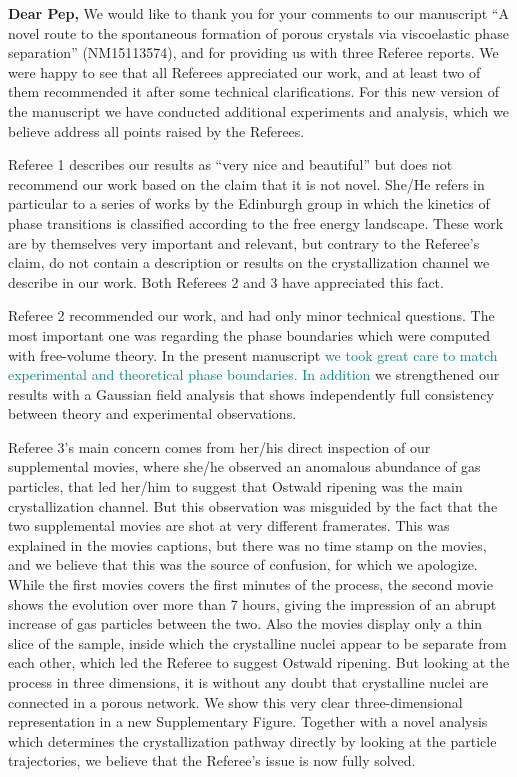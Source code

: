 \documentclass[11pt,a4paper]{article}
\begin{document}




\noindent
{\bf Dear Pep,}
\vskip 0.3cm
We would like to thank you for your comments to our manuscript ``A novel route to the spontaneous formation of porous crystals via viscoelastic phase separation'' (NM15113574),
and for providing us with three Referee reports.
We were happy to see that all Referees appreciated our work, and at least two of them recommended it after some technical clarifications.
For this new version of the manuscript we have conducted additional experiments and analysis,
which we believe address all points raised by the Referees.

Referee 1 describes our results as ``very nice and beautiful'' but does not recommend our work
based on the claim that it is not novel. She/He refers in particular to a series of works by the Edinburgh group in which the kinetics of phase
transitions is classified according to the free energy landscape. These work are by themselves very important and relevant, but contrary
to the Referee's claim, do not contain a description or results on the crystallization channel we describe in our work.
Both Referees 2 and 3 have appreciated this fact.

Referee 2 recommended our work, and had only minor technical questions. The most important one was regarding the phase boundaries
which were computed with free-volume theory. In the present manuscript \textcolor{teal}{we took great care to match experimental and theoretical phase boundaries. In addition} we strengthened our results with a Gaussian field analysis
that shows independently full consistency between theory and experimental observations.

Referee 3's main concern comes from her/his direct inspection of our supplemental movies, where she/he observed an anomalous abundance
of gas particles, that led her/him to suggest that Ostwald ripening was the main crystallization channel. But this observation
was misguided by the fact that the two supplemental movies are shot at very different framerates. This was explained in the movies captions,
but there was no time stamp on the movies, and we believe that this was the source of confusion, for which we apologize. While the first movies covers
the first minutes of the process, the second movie shows the evolution over more than 7 hours, giving the impression
of an abrupt increase of gas particles between the two. Also the movies display only a thin slice of the sample, inside which
the crystalline nuclei appear to be separate from each other, which led the Referee to suggest Ostwald ripening. But looking at the process in three dimensions,
it is without any doubt that crystalline nuclei are connected in a porous network. We show this very clear three-dimensional representation in a new Supplementary Figure.
Together with a novel analysis which determines the crystallization pathway directly by looking
at the particle trajectories, we believe that the Referee's issue is now fully solved.
\end{document}
